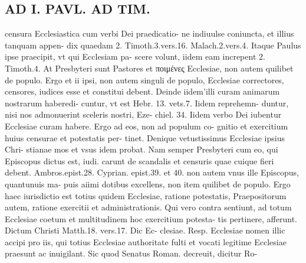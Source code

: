 \documentclass{article}
\begin{document}
\begin{pages}
\section*{AD I. PAVL. AD TIM. }
\marginpar{[ p.446 ]}\pstart censura Ecclesiastica cum verbi Dei praedicatio- ne indiuulse coniuncta, et illius tanquam appen- dix quaedam 2. Timoth.3.vers.16. Malach.2.vers.4. Itaque Paulus ipse praecipit, vt qui Ecclesiam pa- scere volunt, iidem eam increpent 2. Timoth.4. At Presbyteri sunt Pastores et ποιμένες Ecclesiae, non autem quilibet de populo. Ergo et ii ipsi, non autem singuli de populo, Ecclesiae correctores, censores, iudices esse et constitui debent. Deinde iidem’illi curam animarum nostrarum haberedi- cuntur, vt est Hebr. 13. vets.7. Iidem reprehemn- duntur, nisi nos admonuerint sceleris nostri, Eze- chiel. 34. Iidem verbo Dei iubentur Ecclesiae curam habere. Ergo ad eos, non ad populum co- gnitio et exercitium huius censurae et potestatis per- tinet. Denique  vetustissimus Ecclesiae ipsius Chri- stianae mos et vsus idem probat. Nam semper Presbyteri cum eo, qui Episcopus dictus est, iudi. carunt de scandalis et censuris quae cuique fieri debent. Ambros.epist.28. Cyprian. epist.39. et 40. non autem vnus ille Episcopus, quantunuis ma- puis aiimi dotibus excellens, non item quilibet de populo. Ergo haec iurisdictio est totius quidem Ecclesiae, ratione potestatis, Praepositorum autem, ratione exercitii et administrationis.  \pend\pstart Qui vero contra sentiunt, ad totum Ecclesiae coetum et multitudinem hoc exercitium potesta- tis pertinere, afferunt.  \pend{} Dictum Christi Matth.18. vers.17. Dic Ec- clesiae. Resp. Ecclesiae nomen illic accipi pro iis, qui totius Ecclesiae authoritate fulti et vocati legitime Ecclesiae praesunt ac inuigilant. Sic quod Senatus Roman. decreuit, dicitur Ro-  \pend

\end{pages}
\end{document}

